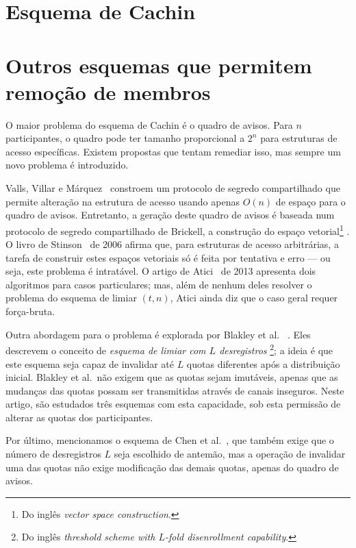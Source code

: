 \documentclass[10pt,twocolumn]{article}
\theoremstyle{definition}
\begin{document}
\section{Esquema de Cachin}
\section{Outros esquemas que permitem remoção de membros}

O maior problema do esquema de Cachin é o quadro de avisos.
Para $n$ participantes,
o quadro pode ter tamanho proporcional a $2^n$
para estruturas de acesso específicas.
Existem propostas que tentam remediar isso,
mas sempre um novo problema é introduzido.

Valls, Villar e Márquez~\cite{VallsVillarMarqez1999}
constroem um protocolo de segredo compartilhado
que permite alteração na estrutura de acesso
usando apenas $O(n)$ de espaço para o quadro de avisos.
Entretanto,
a geração deste quadro de avisos é baseada
num protocolo de segredo compartilhado de Brickell,
a construção do espaço vetorial\footnote{
    Do inglês \emph{vector space construction}.
}
\cite{Brickell1990}.
O livro de Stinson~\cite[p.~499]{Stinson2006} de 2006
afirma que, para estruturas de acesso arbitrárias,
a tarefa de construir estes espaços vetoriais
só é feita por tentativa e erro
--- ou seja, este problema é intratável.
O artigo de Atici~\cite{Atici2013} de 2013
apresenta dois algoritmos para casos particulares;
mas, além de nenhum deles resolver o problema do esquema de limiar $(t, n)$,
Atici ainda diz que o caso geral requer força-bruta.

Outra abordagem para o problema é explorada por Blakley et al.%
~\cite{BlakleyBlakleyChanMassey1993}.
Eles descrevem o conceito de \emph{esquema de limiar com $L$ desregistros}%
\footnote{
    Do inglês \emph{threshold scheme with $L$-fold disenrollment capability}.
};
a ideia é que este esquema
seja capaz de invalidar até $L$ quotas diferentes após a distribuição inicial.
Blakley et al.\ não exigem que as quotas sejam imutáveis,
apenas que as mudanças das quotas possam ser transmitidas através de canais inseguros.
Neste artigo,
são estudados três esquemas com esta capacidade,
sob esta permissão de alterar as quotas dos participantes.

Por último,
mencionamos o esquema de Chen et al.~\cite{ChenGollmanMitchellWild1997},
que também exige que o número de desregistros $L$ seja escolhido de antemão,
mas a operação de invalidar uma das quotas
não exige modificação das demais quotas,
apenas do quadro de avisos.



\end{document}

